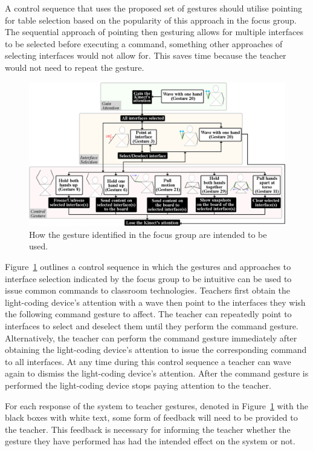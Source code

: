 \documentclass[link]{IWCOMP}
\begin{document}
A control sequence that uses the proposed set of gestures should utilise pointing for table selection based on the popularity of this approach in the focus group.
The sequential approach of pointing then gesturing allows for multiple interfaces to be selected before executing a command, something other approaches of selecting interfaces would not allow for.
This saves time because the teacher would not need to repeat the gesture.

\begin{figure}[t]
   \centering
   \includegraphics[width=1\textwidth]{figures/control_flow.png}
   \caption{How the gesture identified in the focus group are intended to be used.}
   \label{fig:flow}
\end{figure}

Figure~\ref{fig:flow} outlines a control sequence in which the gestures and approaches to interface selection indicated by the focus group to be intuitive can be used to issue common commands to classroom technologies.
Teachers first obtain the light-coding device's attention with a wave then point to the interfaces they wish the following command gesture to affect.
The teacher can repeatedly point to interfaces to select and deselect them until they perform the command gesture.
Alternatively, the teacher can perform the command gesture immediately after obtaining the light-coding device's attention to issue the corresponding command to all interfaces.
At any time during this control sequence a teacher can wave again to dismiss the light-coding device's attention.
After the command gesture is performed the light-coding device stops paying attention to the teacher.

For each response of the system to teacher gestures, denoted in Figure~\ref{fig:flow} with the black boxes with white text, some form of feedback will need to be provided to the teacher.
This feedback is necessary for informing the teacher whether the gesture they have performed has had the intended effect on the system or not.
\end{document}
